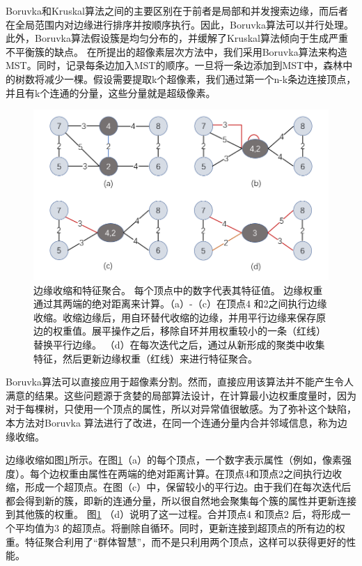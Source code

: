 Boruvka和Kruskal算法之间的主要区别在于前者是局部和并发搜索边缘，而后者在全局范围内对边缘进行排序并按顺序执行。因此，Boruvka算法可以并行处理。此外，Boruvka算法假设簇是均匀分布的，并缓解了Kruskal算法倾向于生成严重不平衡簇的缺点。 在所提出的超像素层次方法中，我们采用Boruvka算法来构造MST。同时，记录每条边加入MST的顺序。一旦将一条边添加到MST中，森林中的树数将减少一棵。假设需要提取k个超像素，我们通过第一个n-k条边连接顶点，并且有k个连通的分量，这些分量就是超级像素。

\begin{figure}[h]
\begin{center}
\includegraphics[width=1\textwidth]{figures/FCM1.png}
\end{center}
\vspace{-5mm}
\caption{边缘收缩和特征聚合。 每个顶点中的数字代表其特征值。 边缘权重通过其两端的绝对距离来计算。（a）-（c）在顶点4 和2之间执行边缘收缩。收缩边缘后，用自环替代收缩的边缘，并用平行边缘来保存原边的权重值。展平操作之后，移除自环并用权重较小的一条（红线）替换平行边缘。 （d）在每次迭代之后，通过从新形成的聚类中收集特征，然后更新边缘权重（红线）来进行特征聚合。}
\label{fig4.2}
\end{figure}

Boruvka算法可以直接应用于超像素分割。然而，直接应用该算法并不能产生令人满意的结果。这些问题源于贪婪的局部算法设计，在计算最小边权重度量时，因为对于每棵树，只使用一个顶点的属性，所以对异常值很敏感。为了弥补这个缺陷，本方法对Boruvka 算法进行了改进，在同一个连通分量内合并邻域信息，称为边缘收缩。

边缘收缩如图\ref{fig4.2}所示。在图\ref{fig4.2}（a）的每个顶点，一个数字表示属性（例如，像素强度）。每个边权重由属性在两端的绝对距离计算。在顶点4和顶点2之间执行边收缩，形成一个超顶点。在图（c）中，保留较小的平行边。由于我们在每次迭代后都会得到新的簇，即新的连通分量，所以很自然地会聚集每个簇的属性并更新连接到其他簇的权重。
图\ref{fig4.2} （d）说明了这一过程。合并顶点4 和顶点2 后，将形成一个平均值为3 的超顶点。将删除自循环。同时，更新连接到超顶点的所有边的权重。特征聚合利用了“群体智慧”，而不是只利用两个顶点，这样可以获得更好的性能。

